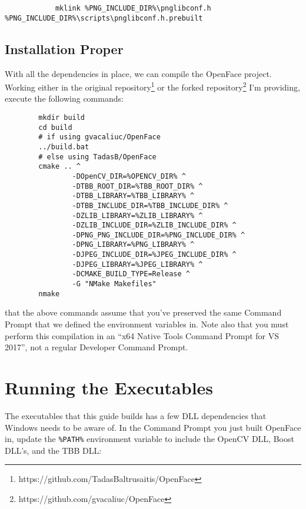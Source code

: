 \documentclass{tufte-handout}
\begin{document}
        \begin{lstlisting}
            mklink %PNG_INCLUDE_DIR%\pnglibconf.h %PNG_INCLUDE_DIR%\scripts\pnglibconf.h.prebuilt
        \end{lstlisting}

    \subsection{Installation Proper}

    With all the dependencies in place, we can compile the OpenFace project.  Working
    either in the original repository\footnote{https://github.com/TadasBaltrusaitis/OpenFace} or 
    the forked repository\footnote{https://github.com/gvacaliuc/OpenFace} I'm providing,
    execute the following commands:

    \begin{lstlisting}
        mkdir build
        cd build
        # if using gvacaliuc/OpenFace
        ../build.bat
        # else using TadasB/OpenFace
        cmake .. ^
                -DOpenCV_DIR=%OPENCV_DIR% ^
                -DTBB_ROOT_DIR=%TBB_ROOT_DIR% ^
                -DTBB_LIBRARY=%TBB_LIBRARY% ^
                -DTBB_INCLUDE_DIR=%TBB_INCLUDE_DIR% ^
                -DZLIB_LIBRARY=%ZLIB_LIBRARY% ^
                -DZLIB_INCLUDE_DIR=%ZLIB_INCLUDE_DIR% ^
                -DPNG_PNG_INCLUDE_DIR=%PNG_INCLUDE_DIR% ^
                -DPNG_LIBRARY=%PNG_LIBRARY% ^
                -DJPEG_INCLUDE_DIR=%JPEG_INCLUDE_DIR% ^
                -DJPEG_LIBRARY=%JPEG_LIBRARY% ^
                -DCMAKE_BUILD_TYPE=Release ^
                -G "NMake Makefiles"
        nmake
    \end{lstlisting}

     that the above commands assume that you've preserved the same Command
    Prompt that we defined the environment variables in.  Note also that you must perform this
    compilation in an ``x64 Native Tools Command Prompt for VS 2017'', not a regular Developer
    Command Prompt.

\section{Running the Executables}

    The executables that this guide builds has a few DLL dependencies that Windows needs to
    be aware of.  In the Command Prompt you just built OpenFace in, update the \Verb|%
    environment variable to include the OpenCV DLL, Boost DLL's, and the TBB DLL:
\end{document}
